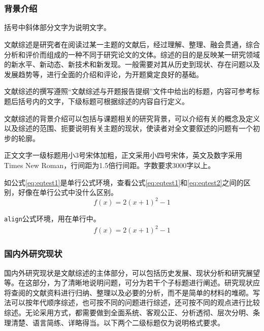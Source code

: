 \part{} %
\label{prt:文献综述_}
	\setcounter{section}{0}
	\section{背景介绍} %
	\label{sec:背景介绍}
		括号中斜体部分文字为说明文字。

		文献综述是研究者在阅读过某一主题的文献后，经过理解、整理、融会贯通，综合分析和评价而组成的一种不同于研究论文的文体。综述的目的是反映某一研究领域的新水平、新动态、新技术和新发现。一般需要对其从历史到现状、存在问题以及发展趋势等，进行全面的介绍和评论，为开题奠定良好的基础。

		文献综述的撰写遵照“文献综述与开题报告提纲”文件中给出的标题，内容可参考标题后括号内的文字，下级标题可根据综述的内容自行定义。

		文献综述的背景介绍可以包括与课题相关的研究背景，可以介绍有关的概念及定义以及综述的范围、扼要说明有关主题的现状，使读者对全文要叙述的问题有一个初步的轮廓。

		正文文字一级标题用小3号宋体加粗，正文采用小四号宋体，英文及数字采用Times New Roman，行间距为1.5倍行间距。字数要求3000字以上。

		如公式\eqref{eq:eqtest1}是单行公式环境，查看公式\eqref{eq:eqtest1}和\eqref{eq:eqtest2}之间的区别，好像在单行公式中没什么区别。
		\begin{equation}
		\label{eq:eqtest1}
			f(x) = 2(x + 1)^{2} - 1
		\end{equation}

		\texttt{align}公式环境，用在单行中。
		\begin{align}
		\label{eq:eqtest2}
			f(x) = 2(x + 1)^{2} - 1
		\end{align}
	\newpage
	\section{国内外研究现状} %
	\label{sec:国内外研究现状}
		国内外研究现状是文献综述的主体部分，可以包括历史发展、现状分析和研究展望等。在这部分，为了清晰地说明问题，可分为若干个子标题进行阐述。研究现状应将查阅的文献资料进行归纳、整理以及必要的分析，而不是简单的材料的堆砌。写法可以按年代顺序综述，也可按不同的问题进行综述，还可按不同的观点进行比较综述。无论采用方式，都需要做到全面系统、客观公正、分析透彻、层次分明、条理清楚、语言简练、详略得当。以下两个二级标题仅为说明格式要求。

